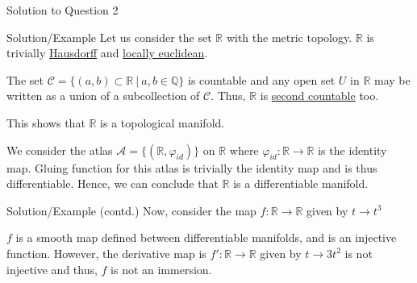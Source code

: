 \documentclass{beamer}
\begin{document}
\begin{frame}{Solution to Question 2}
    \begin{block}{Solution/Example}
    Let us consider the set $\mathbb{R}$ with the metric topology. $\mathbb{R}$ is trivially \underline{Hausdorff} and \underline{locally euclidean}. 
    
    The set $\mathscr{C} = \{ (a,b) \subset \mathbb{R} \ | \ a,b \in \mathbb{Q}\}$ is countable and any open set $U$ in $\mathbb{R}$ may be written as a union of a subcollection of $\mathscr{C}$. Thus, $\mathbb{R}$ is \underline{second countable} too. 
    
    This shows that $\mathbb{R}$ is a topological manifold.
    
    We consider the atlas $\mathscr{A} = \{(\mathbb{R}, \varphi_{id})\}$ on $\mathbb{R}$ where $\varphi_{id}: \mathbb{R} \to  \mathbb{R}$ is the identity map. Gluing function for this atlas is trivially the identity map and is thus differentiable. Hence, we can conclude that $\mathbb{R}$ is a differentiable manifold.
    \end{block}
    
\end{frame}

\begin{frame}
    \begin{block}{Solution/Example (contd.)}
    Now, consider the map $f: \mathbb{R} \to \mathbb{R}$ given by $t \to t^3$
    
    $f$ is a smooth map defined between differentiable manifolds, and is an injective function. However, the derivative map is $f': \mathbb{R} \to \mathbb{R}$ given by $t \to 3t^2$ is not injective and thus, $f$ is not an immersion. \qedsymbol
    \end{block}
    
\end{frame}









\end{document}
